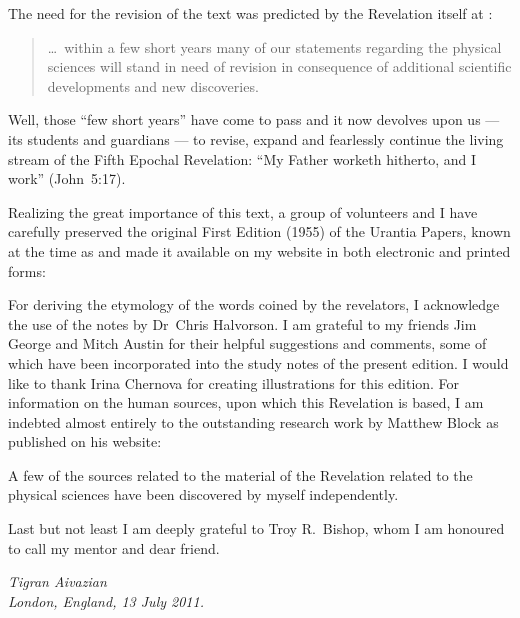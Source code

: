 The need for the revision of the text was predicted by the Revelation itself at :
\begin{quote}
\ldots\ within a few short years many of our statements regarding the physical sciences will stand in need of revision in consequence of additional scientific developments and new discoveries.
\end{quote}
Well, those ``few short years'' have come to pass and it now devolves upon us --- its students and guardians --- to revise,
expand and fearlessly continue the living stream of the Fifth Epochal Revelation:
``My Father worketh hitherto, and I work'' (John~5:17).

Realizing the great importance of this text, a group of volunteers and I have carefully preserved
the original First Edition (1955) of the Urantia Papers, known at the time as 
and made it available on my website in both electronic and printed forms:
\begin{center}\end{center}
For deriving the etymology of the words coined by the revelators, I acknowledge the use of the notes by Dr~Chris Halvorson.
I am grateful to my friends Jim George and Mitch Austin for their helpful suggestions and comments,
some of which have been incorporated into the study notes of the present edition.
I would like to thank Irina Chernova for creating illustrations for this edition.
For information on the human sources, upon which this Revelation is based, I am indebted almost entirely to the outstanding
research work by Matthew Block as published on his website:
\begin{center}\end{center}
A few of the sources related to the material of the Revelation related to the physical sciences have been discovered by myself
independently.

Last but not least I am deeply grateful to Troy R.~Bishop, whom I am honoured to call my mentor and dear friend.



\begin{flushleft}
\itshape
Tigran Aivazian\\
London, England, 13 July 2011.\\
\end{flushleft}
